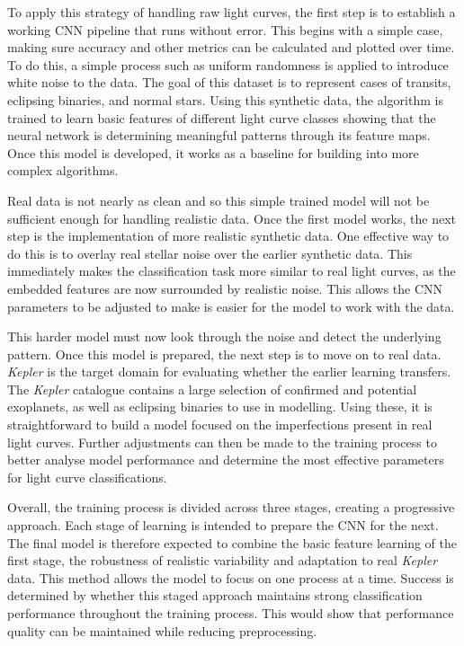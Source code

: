 To apply this strategy of handling raw light curves, the first step is to establish a working CNN pipeline that runs without error. This begins with a simple case, making sure accuracy and other metrics can be calculated and plotted over time. To do this, a simple process such as uniform randomness is applied to introduce white noise to the data. The goal of this dataset is to represent cases of transits, eclipsing binaries, and normal stars. Using this synthetic data, the algorithm is trained to learn basic features of different light curve classes showing that the neural network is determining meaningful patterns through its feature maps. Once this model is developed, it works as a baseline for building into more complex algorithms. 

Real data is not nearly as clean and so this simple trained model will not be sufficient enough for handling realistic data. Once the first model works, the next step is the implementation of more realistic synthetic data. One effective way to do this is to overlay real stellar noise over the earlier synthetic data. This immediately makes the classification task more similar to real light curves, as the embedded features are now surrounded by realistic noise. This allows the CNN parameters to be adjusted to make is easier for the model to work with the data. 

This harder model must now look through the noise and detect the underlying pattern. Once this model is prepared, the next step is to move on to real data. \textit{Kepler} is the target domain for evaluating whether the earlier learning transfers. The \textit{Kepler} catalogue contains a large selection of confirmed and potential exoplanets, as well as eclipsing binaries to use in modelling. Using these, it is straightforward to build a model focused on the imperfections present in real light curves. Further adjustments can then be made to the training process to better analyse model performance and determine the most effective parameters for light curve classifications.

Overall, the training process is divided across three stages, creating a progressive approach. Each stage of learning is intended to prepare the CNN for the next. The final model is therefore expected to combine the basic feature learning of the first stage, the robustness of realistic variability and adaptation to real \textit{Kepler} data. This method allows the model to focus on one process at a time. Success is determined by whether this staged approach maintains strong classification performance throughout the training process. This would show that performance quality can be maintained while reducing preprocessing. 
